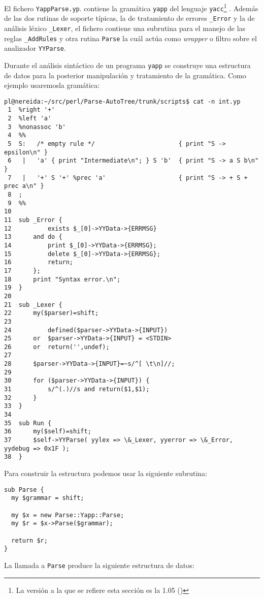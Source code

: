 El fichero \verb|YappParse.yp|.
contiene la gramática \verb|yapp| del lenguaje
\verb|yacc|\footnote{La versión a la que se refiere esta sección es la 1.05
()}
. 
Además de las dos rutinas de soporte típicas,
la de tratamiento de errores \verb|_Error| y la
de análisis léxico \verb|_Lexer|, el fichero
contiene una subrutina para el manejo de las 
reglas \verb|_AddRules| y otra rutina \verb|Parse| la cuál
 actúa como \emph{wrapper} o filtro sobre el analizador
\verb|YYParse|.

Durante el análisis sintáctico 
de un programa \verb|yapp| se construye una estructura de 
datos para la posterior manipulación y tratamiento de 
la gramática.  
Como ejemplo usaremosla gramática:
\begin{verbatim}
pl@nereida:~/src/perl/Parse-AutoTree/trunk/scripts$ cat -n int.yp
 1  %right '+'
 2  %left 'a'
 3  %nonassoc 'b'
 4  %%
 5  S:   /* empty rule */                       { print "S -> epsilon\n" }
 6   |   'a' { print "Intermediate\n"; } S 'b'  { print "S -> a S b\n" }
 7   |   '+' S '+' %prec 'a'                    { print "S -> + S + prec a\n" }
 8  ;
 9  %%
10
11  sub _Error {
12          exists $_[0]->YYData->{ERRMSG}
13      and do {
14          print $_[0]->YYData->{ERRMSG};
15          delete $_[0]->YYData->{ERRMSG};
16          return;
17      };
18      print "Syntax error.\n";
19  }
20
21  sub _Lexer {
22      my($parser)=shift;
23
24          defined($parser->YYData->{INPUT})
25      or  $parser->YYData->{INPUT} = <STDIN>
26      or  return('',undef);
27
28      $parser->YYData->{INPUT}=~s/^[ \t\n]//;
29
30      for ($parser->YYData->{INPUT}) {
31          s/^(.)//s and return($1,$1);
32      }
33  }
34
35  sub Run {
36      my($self)=shift;
37      $self->YYParse( yylex => \&_Lexer, yyerror => \&_Error, yydebug => 0x1F );
38  }
\end{verbatim}
Para construir la estructura podemos usar la siguiente subrutina:
\begin{verbatim}
sub Parse {
  my $grammar = shift;

  my $x = new Parse::Yapp::Parse;
  my $r = $x->Parse($grammar);

  return $r;
}
\end{verbatim}
La llamada a \verb|Parse| produce la siguiente estructura de datos:
